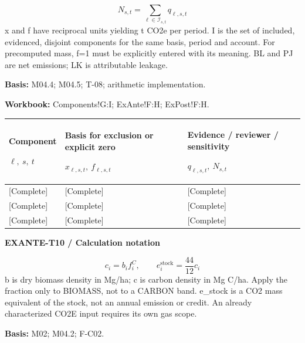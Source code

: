 {\fontsize{9}{11}\selectfont\[ N_{s,t}=\sum_{\ell\in\mathcal I_{s,t}}q_{\ell,s,t} \]}
x and f have reciprocal units yielding t CO2e per period. I is the set of included, evidenced, disjoint components for the same basis, period and account. For precomputed mass, f=1 must be explicitly entered with its meaning. BL and PJ are net emissions; LK is attributable leakage.\par
\textbf{Basis:} M04.4; M04.5; T-08; arithmetic implementation.\par
\textbf{Workbook:} Components!G:I; ExAnte!F:H; ExPost!F:H.\par\endgroup
{\sffamily\fontsize{8.3}{10.3}\selectfont\begin{longtable}{@{}P{54.83mm} P{54.83mm} P{54.83mm}@{}}
\toprule
\textbf{Component}\par {\normalfont\fontsize{8.2}{10}\selectfont $\ell,\ s,\ t$} & \textbf{Basis for exclusion or explicit zero}\par {\normalfont\fontsize{8.2}{10}\selectfont $x_{\ell,s,t},\ f_{\ell,s,t}$} & \textbf{Evidence / reviewer / sensitivity}\par {\normalfont\fontsize{8.2}{10}\selectfont $q_{\ell,s,t},\ N_{s,t}$}\\\midrule\endhead
\rule{0pt}{8mm}[Complete] & [Complete] & [Complete]\\\hline
\rule{0pt}{8mm}[Complete] & [Complete] & [Complete]\\\hline
\rule{0pt}{8mm}[Complete] & [Complete] & [Complete]\\\hline
\end{longtable}}
\par\begingroup\sffamily\fontsize{8}{10}\selectfont\color{NEBGreen}\setlength{\parskip}{2pt}\setlength{\abovedisplayskip}{4pt}\setlength{\belowdisplayskip}{4pt}\setlength{\abovedisplayshortskip}{2pt}\setlength{\belowdisplayshortskip}{3pt}
\textbf{EXANTE-T10 / Calculation notation}\par
{\fontsize{9}{11}\selectfont\[ c_i=b_i f_i^C,\qquad e_i^{\mathrm{stock}}=\frac{44}{12}c_i \]}
b is dry biomass density in Mg/ha; c is carbon density in Mg C/ha. Apply the fraction only to BIOMASS, not to a CARBON band. e\_stock is a CO2 mass equivalent of the stock, not an annual emission or credit. An already characterized CO2E input requires its own gas scope.\par
\textbf{Basis:} M02; M04.2; F-C02.\par
